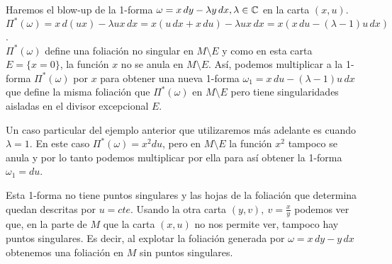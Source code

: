 \begin{Ejemplo}
\label{Ej:BlowUpLineal}
Haremos el blow-up de la 1-forma $\omega=x\, dy-\lambda y\, dx,\lambda\in\mathbb{C}$ en la carta $(x,u)$.\\

$\Pi^{*}(\omega)=x\, d(ux)-\lambda ux\, dx=x(u\, dx +x\, du)-\lambda ux\, dx=x(x\, du-(\lambda-1)u\, dx)$.\\

$\Pi^{*}(\omega)$ define una foliación no singular en $M\setminus E$ y como en esta carta $E=\{x=0\}$, la función $x$ no se anula en $M\setminus E$. Así, podemos multiplicar a la 1-forma $\Pi^{*}(\omega)$ por $x$ para obtener una nueva 1-forma $\omega_{1}=x\, du-(\lambda-1)u\, dx$ que define la misma foliación que $\Pi^{*}(\omega)$ en $M\setminus E$ pero tiene singularidades aisladas en el divisor excepcional $E$.
\end{Ejemplo}





Un caso particular del ejemplo anterior que utilizaremos más adelante es cuando $\lambda=1$. En este caso $\Pi^{*}(\omega)=x^{2}du$, pero en $M\setminus E$ la función $x^{2}$ tampoco se anula y por lo tanto podemos multiplicar por ella para así obtener la 1-forma $\omega_{1}=du$.

Esta 1-forma no tiene puntos singulares y las hojas de la foliación que determina quedan descritas por $u=cte$. Usando la otra carta $(y,v),\ v=\tfrac{x}{y}$ podemos ver que, en la parte de $M$ que la carta $(x,u)$ no nos permite ver, tampoco hay puntos singulares. Es decir, al explotar la foliación generada por $\omega=x\, dy-y\, dx$ obtenemos una foliación en $M$ sin puntos singulares.\\

